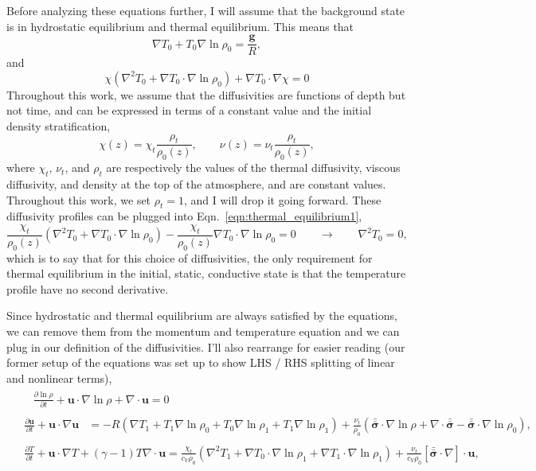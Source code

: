 \documentclass[aps, pre, onecolumn, nofootinbib, notitlepage, groupedaddress, amsfonts, amssymb, amsmath, longbibliography, superscriptaddress]{revtex4-1}
\newcommand{\grad}{\ensuremath{\nabla}}
\newcommand{\lilstressT}{\ensuremath{\bm{\bar{\bar{\sigma}}}}}
\begin{document}
Before analyzing these equations further, I will assume that the background state is in hydrostatic equilibrium and thermal equilibrium.
This means that
\begin{equation}
\grad T_0 + T_0\grad\ln\rho_0 = \frac{\bm{g}}{R},
\label{eqn:hydrostatic_equilibrium1}
\end{equation}
and
\begin{equation}
\chi (\grad^2 T_0 + \grad T_0 \cdot\grad\ln\rho_0) + \grad T_0 \cdot\grad\chi  = 0
\label{eqn:thermal_equilibrium1}
\end{equation}
Throughout this work, we assume that the diffusivities are functions of depth but not time, and can be expressed in terms of a constant value and the initial density stratification,
$$
\chi(z) = \chi_t \frac{\rho_t}{\rho_0(z)}, \qquad
\nu(z)  = \nu_t  \frac{\rho_t}{\rho_0(z)},
$$
where $\chi_t$, $\nu_t$, and $\rho_t$ are respectively the values of the thermal diffusivity, viscous diffusivity, and density at the top of the atmosphere, and are constant values.
Throughout this work, we set $\rho_t = 1$, and I will drop it going forward.
These diffusivity profiles can be plugged into Eqn.~\ref{eqn:thermal_equilibrium1},
$$
\frac{\chi_t}{\rho_0(z)}(\grad^2 T_0 + \grad T_0 \cdot \grad\ln\rho_0) - \frac{\chi_t}{\rho_0(z)}\grad T_0 \cdot\grad\ln\rho_0 = 0
\qquad\rightarrow\qquad
\grad^2 T_0 = 0,
$$
which is to say that for this choice of diffusivities, the only requirement for thermal equilibrium in the initial, static, conductive state is that the temperature profile have no second derivative.

Since hydrostatic and thermal equilibrium are always satisfied by the equations, we can remove them from the momentum and temperature equation and we can plug in our definition of the diffusivities.
I'll also rearrange for easier reading (our former setup of the equations was set up to show LHS / RHS splitting of linear and nonlinear terms),
\begin{align}
&\begin{aligned}
&\frac{\partial \ln\rho}{\partial t} + \bm{u}\cdot\grad\ln\rho + \grad\cdot\bm{u}  = 0
	\label{eqn:ab17continuity_eqn2}
\end{aligned}\\
&\begin{aligned}
\frac{\partial\bm{u}}{\partial t} + \bm{u}\cdot\grad\bm{u}
&= - R (\grad T_1 + T_1\grad\ln\rho_0 + T_0\grad\ln\rho_1 + T_1 \grad\ln\rho_1)
+ \frac{\nu_t}{\rho_0}\left(\lilstressT\cdot\grad\ln\rho + \grad\cdot\lilstressT - \lilstressT\cdot\grad\ln\rho_0\right),
\label{eqn:ab17momentum_eqn2}
\end{aligned}\\
&\begin{aligned}
\frac{\partial T}{\partial t} + \bm{u}\cdot\grad T + (\gamma-1)T\grad\cdot\bm{u}
=	\frac{\chi_t}{c_V\rho_0}(\grad^2 T_1 + \grad T_0\cdot\grad\ln\rho_1 + \grad T_1\cdot\grad\ln\rho_1)
	+ \frac{\nu_t }{c_V\rho_0}[\lilstressT\cdot\nabla]\cdot\bm{u}, 
	\label{eqn:ab17energy_eqn2}
\end{aligned}
\end{align}
\end{document}
